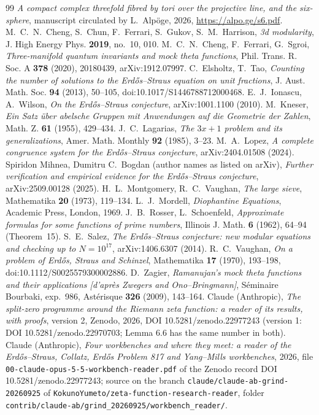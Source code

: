 \begin{thebibliography}{99}
\small
{} \emph{A compact complex threefold fibred by tori over the projective line, and the six-sphere}, manuscript circulated by L.~Alpöge, 2026, \url{https://alpo.ge/s6.pdf}.
 M.~C.~N.~Cheng, S.~Chun, F.~Ferrari, S.~Gukov, S.~M.~Harrison, \emph{3d modularity}, J. High Energy Phys. \textbf{2019}, no.~10, 010.
 M.~C.~N.~Cheng, F.~Ferrari, G.~Sgroi, \emph{Three-manifold quantum invariants and mock theta functions}, Phil. Trans. R. Soc. A \textbf{378} (2020), 20180439, arXiv:1912.07997.
 C.~Elsholtz, T.~Tao, \emph{Counting the number of solutions to the Erdős--Straus equation on unit fractions}, J. Aust. Math. Soc. \textbf{94} (2013), 50--105, doi:10.1017/S1446788712000468.
 E.~J.~Ionascu, A.~Wilson, \emph{On the Erdős--Straus conjecture}, arXiv:1001.1100 (2010).
 M.~Kneser, \emph{Ein Satz über abelsche Gruppen mit Anwendungen auf die Geometrie der Zahlen}, Math. Z. \textbf{61} (1955), 429--434.
 J.~C.~Lagarias, \emph{The $3x+1$ problem and its generalizations}, Amer. Math. Monthly \textbf{92} (1985), 3--23.
 M.~A.~Lopez, \emph{A complete congruence system for the Erdős--Straus conjecture}, arXiv:2404.01508 (2024).
 Spiridon Mihnea, Dumitru C.~Bogdan (author names as listed on arXiv), \emph{Further verification and empirical evidence for the Erdős--Straus conjecture}, arXiv:2509.00128 (2025).
 H.~L.~Montgomery, R.~C.~Vaughan, \emph{The large sieve}, Mathematika \textbf{20} (1973), 119--134.
 L.~J.~Mordell, \emph{Diophantine Equations}, Academic Press, London, 1969.
 J.~B.~Rosser, L.~Schoenfeld, \emph{Approximate formulas for some functions of prime numbers}, Illinois J. Math. \textbf{6} (1962), 64--94 (Theorem~15).
 S.~E.~Salez, \emph{The Erdős--Straus conjecture: new modular equations and checking up to $N=10^{17}$}, arXiv:1406.6307 (2014).
 R.~C.~Vaughan, \emph{On a problem of Erdős, Straus and Schinzel}, Mathematika \textbf{17} (1970), 193--198, doi:10.1112/S0025579300002886.
 D.~Zagier, \emph{Ramanujan's mock theta functions and their applications [d'après Zwegers and Ono--Bringmann]}, Séminaire Bourbaki, exp.~986, Astérisque \textbf{326} (2009), 143--164.
 Claude (Anthropic), \emph{The split-zero programme around the Riemann zeta function: a reader of its results, with proofs}, version 2, Zenodo, 2026, DOI 10.5281/zenodo.22977243 (version 1: DOI 10.5281/zenodo.22970703; Lemma 6.6 has the same number in both).
 Claude (Anthropic), \emph{Four workbenches and where they meet: a reader of the Erdős--Straus, Collatz, Erdős Problem 817 and Yang--Mills workbenches}, 2026, file \texttt{00-claude-opus-5-5-workbench-reader.pdf} of the Zenodo record DOI 10.5281/zenodo.22977243; source on the branch \texttt{claude/claude-ab-grind-20260925} of \texttt{KokunoYumeto/zeta-function-research-reader}, folder \texttt{contrib/claude-ab/grind\_20260925/workbench\_reader/}.
\end{thebibliography}
